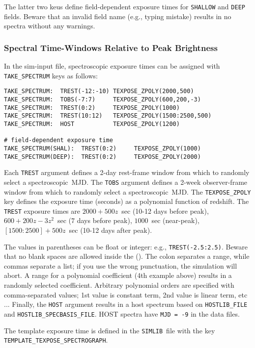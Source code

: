\documentclass[12pt]{article}
\newcommand{\simlib}{{\tt SIMLIB}}
\newcommand{\spec}{spectroscopic}
\begin{document}
The latter two keus define field-dependent exposure times for
{\tt SHALLOW} and {\tt DEEP} fields. Beware that an invalid
field name (e.g., typing mistake) results in no spectra without 
any warnings.


\subsubsection{Spectral Time-Windows Relative to Peak Brightness }
\label{sss:SPEC_EPOCH}

In the sim-input file, spectroscopic exposure times 
can be assigned with {\tt TAKE\_SPECTRUM} keys as follows:
%
\begin{Verbatim}[frame=single]
TAKE_SPECTRUM:  TREST(-12:-10) TEXPOSE_ZPOLY(2000,500)
TAKE_SPECTRUM:  TOBS(-7:7)     TEXPOSE_ZPOLY(600,200,-3)
TAKE_SPECTRUM:  TREST(0:2)     TEXPOSE_ZPOLY(1000) 
TAKE_SPECTRUM:  TREST(10:12)   TEXPOSE_ZPOLY(1500:2500,500)
TAKE_SPECTRUM:  HOST           TEXPOSE_ZPOLY(1200) 

# field-dependent exposure time
TAKE_SPECTRUM(SHAL):  TREST(0:2)     TEXPOSE_ZPOLY(1000) 
TAKE_SPECTRUM(DEEP):  TREST(0:2)     TEXPOSE_ZPOLY(2000) 
\end{Verbatim}
%
Each {\tt TREST} argument defines a 2-day rest-frame window from 
which to randomly select a \spec\ MJD.
The {\tt TOBS} argument defines a 2-week observer-frame window 
from which to randomly select a \spec\ MJD.
The {\tt TEXPOSE\_ZPOLY} key defines the exposure time (seconds) 
as a polynomial function of redshift. 
The {\tt TREST} exposure times are 
$2000+500z$~sec (10-12 days before peak),
$600+200z-3z^2$~sec ($7$ days before peak),
$1000$~sec (near-peak),
$[1500:2500]+500z$~sec (10-12 days after peak).

The values in parentheses can be float or integer: 
e.g., {\tt TREST(-2.5:2.5)}. Beware that no blank
spaces are allowed inside the (). The colon separates
a range, while commas separate a list; if you use the
wrong punctuation, the simulation will abort.
A range for a polynomial coefficient (4th example above)
results in a randomly selected coefficient. 
Arbitrary polynomial orders are specified with comma-separated values;
1st value is constant term, 2nd value is linear term, etc ...
Finally, the {\tt HOST} argument results in a host spectrum
based on {\tt HOSTLIB\_FILE} and {\tt HOSTLIB\_SPECBASIS\_FILE}.
HOST spectra have {\tt MJD = -9} in the data files.


The template exposure time is defined in the \simlib\ file
with the key \\ {\tt TEMPLATE\_TEXPOSE\_SPECTROGRAPH}.
\end{document}
